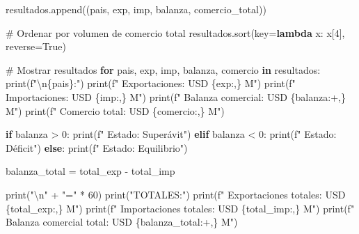 \documentclass[
  doc,
  floatsintext,
  longtable,
  a4paper,
  nolmodern,
  notxfonts,
  notimes,
  12pt,
  colorlinks=true,linkcolor=blue,citecolor=blue,urlcolor=blue]{apa7}
\newenvironment{Shaded}{\begin{snugshade}}{\end{snugshade}}
\newcommand{\BuiltInTok}[1]{\textcolor[rgb]{0.00,0.23,0.31}{#1}}
\newcommand{\CharTok}[1]{\textcolor[rgb]{0.13,0.47,0.30}{#1}}
\newcommand{\CommentTok}[1]{\textcolor[rgb]{0.37,0.37,0.37}{#1}}
\newcommand{\ControlFlowTok}[1]{\textcolor[rgb]{0.00,0.23,0.31}{\textbf{#1}}}
\newcommand{\DecValTok}[1]{\textcolor[rgb]{0.68,0.00,0.00}{#1}}
\newcommand{\KeywordTok}[1]{\textcolor[rgb]{0.00,0.23,0.31}{\textbf{#1}}}
\newcommand{\NormalTok}[1]{\textcolor[rgb]{0.00,0.23,0.31}{#1}}
\newcommand{\OperatorTok}[1]{\textcolor[rgb]{0.37,0.37,0.37}{#1}}
\newcommand{\SpecialCharTok}[1]{\textcolor[rgb]{0.37,0.37,0.37}{#1}}
\newcommand{\SpecialStringTok}[1]{\textcolor[rgb]{0.13,0.47,0.30}{#1}}
\newcommand{\StringTok}[1]{\textcolor[rgb]{0.13,0.47,0.30}{#1}}
\newcommand{\VariableTok}[1]{\textcolor[rgb]{0.07,0.07,0.07}{#1}}
\begin{document}
\begin{Shaded}
\begin{Highlighting}[]
\NormalTok{    resultados.append((pais, exp, imp, balanza, comercio\_total))}

\CommentTok{\# Ordenar por volumen de comercio total}
\NormalTok{resultados.sort(key}\OperatorTok{=}\KeywordTok{lambda}\NormalTok{ x: x[}\DecValTok{4}\NormalTok{], reverse}\OperatorTok{=}\VariableTok{True}\NormalTok{)}

\CommentTok{\# Mostrar resultados}
\ControlFlowTok{for}\NormalTok{ pais, exp, imp, balanza, comercio }\KeywordTok{in}\NormalTok{ resultados:}
    \BuiltInTok{print}\NormalTok{(}\SpecialStringTok{f"}\CharTok{\textbackslash{}n}\SpecialCharTok{\{}\NormalTok{pais}\SpecialCharTok{\}}\SpecialStringTok{:"}\NormalTok{)}
    \BuiltInTok{print}\NormalTok{(}\SpecialStringTok{f"  Exportaciones: USD }\SpecialCharTok{\{}\NormalTok{exp}\SpecialCharTok{:,\}}\SpecialStringTok{ M"}\NormalTok{)}
    \BuiltInTok{print}\NormalTok{(}\SpecialStringTok{f"  Importaciones: USD }\SpecialCharTok{\{}\NormalTok{imp}\SpecialCharTok{:,\}}\SpecialStringTok{ M"}\NormalTok{)}
    \BuiltInTok{print}\NormalTok{(}\SpecialStringTok{f"  Balanza comercial: USD }\SpecialCharTok{\{}\NormalTok{balanza}\SpecialCharTok{:+,\}}\SpecialStringTok{ M"}\NormalTok{)}
    \BuiltInTok{print}\NormalTok{(}\SpecialStringTok{f"  Comercio total: USD }\SpecialCharTok{\{}\NormalTok{comercio}\SpecialCharTok{:,\}}\SpecialStringTok{ M"}\NormalTok{)}
    
    \ControlFlowTok{if}\NormalTok{ balanza }\OperatorTok{\textgreater{}} \DecValTok{0}\NormalTok{:}
        \BuiltInTok{print}\NormalTok{(}\SpecialStringTok{f"  Estado: Superávit"}\NormalTok{)}
    \ControlFlowTok{elif}\NormalTok{ balanza }\OperatorTok{\textless{}} \DecValTok{0}\NormalTok{:}
        \BuiltInTok{print}\NormalTok{(}\SpecialStringTok{f"  Estado: Déficit"}\NormalTok{)}
    \ControlFlowTok{else}\NormalTok{:}
        \BuiltInTok{print}\NormalTok{(}\SpecialStringTok{f"  Estado: Equilibrio"}\NormalTok{)}

\NormalTok{balanza\_total }\OperatorTok{=}\NormalTok{ total\_exp }\OperatorTok{{-}}\NormalTok{ total\_imp}

\BuiltInTok{print}\NormalTok{(}\StringTok{"}\CharTok{\textbackslash{}n}\StringTok{"} \OperatorTok{+} \StringTok{"="} \OperatorTok{*} \DecValTok{60}\NormalTok{)}
\BuiltInTok{print}\NormalTok{(}\StringTok{"TOTALES:"}\NormalTok{)}
\BuiltInTok{print}\NormalTok{(}\SpecialStringTok{f"  Exportaciones totales: USD }\SpecialCharTok{\{}\NormalTok{total\_exp}\SpecialCharTok{:,\}}\SpecialStringTok{ M"}\NormalTok{)}
\BuiltInTok{print}\NormalTok{(}\SpecialStringTok{f"  Importaciones totales: USD }\SpecialCharTok{\{}\NormalTok{total\_imp}\SpecialCharTok{:,\}}\SpecialStringTok{ M"}\NormalTok{)}
\BuiltInTok{print}\NormalTok{(}\SpecialStringTok{f"  Balanza comercial total: USD }\SpecialCharTok{\{}\NormalTok{balanza\_total}\SpecialCharTok{:+,\}}\SpecialStringTok{ M"}\NormalTok{)}
\end{Highlighting}
\end{Shaded}
\end{document}
